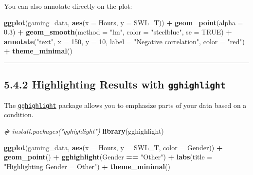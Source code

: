 \documentclass[
]{book}
\newenvironment{Shaded}{\begin{snugshade}}{\end{snugshade}}
\newcommand{\AttributeTok}[1]{\textcolor[rgb]{0.13,0.29,0.53}{#1}}
\newcommand{\CommentTok}[1]{\textcolor[rgb]{0.56,0.35,0.01}{\textit{#1}}}
\newcommand{\ConstantTok}[1]{\textcolor[rgb]{0.56,0.35,0.01}{#1}}
\newcommand{\DecValTok}[1]{\textcolor[rgb]{0.00,0.00,0.81}{#1}}
\newcommand{\FloatTok}[1]{\textcolor[rgb]{0.00,0.00,0.81}{#1}}
\newcommand{\FunctionTok}[1]{\textcolor[rgb]{0.13,0.29,0.53}{\textbf{#1}}}
\newcommand{\NormalTok}[1]{#1}
\newcommand{\SpecialCharTok}[1]{\textcolor[rgb]{0.81,0.36,0.00}{\textbf{#1}}}
\newcommand{\StringTok}[1]{\textcolor[rgb]{0.31,0.60,0.02}{#1}}
\begin{document}
You can also annotate directly on the plot:

\begin{Shaded}
\begin{Highlighting}[]
\FunctionTok{ggplot}\NormalTok{(gaming\_data, }\FunctionTok{aes}\NormalTok{(}\AttributeTok{x =}\NormalTok{ Hours, }\AttributeTok{y =}\NormalTok{ SWL\_T)) }\SpecialCharTok{+}
  \FunctionTok{geom\_point}\NormalTok{(}\AttributeTok{alpha =} \FloatTok{0.3}\NormalTok{) }\SpecialCharTok{+}
  \FunctionTok{geom\_smooth}\NormalTok{(}\AttributeTok{method =} \StringTok{"lm"}\NormalTok{, }\AttributeTok{color =} \StringTok{"steelblue"}\NormalTok{, }\AttributeTok{se =} \ConstantTok{TRUE}\NormalTok{) }\SpecialCharTok{+}
  \FunctionTok{annotate}\NormalTok{(}\StringTok{"text"}\NormalTok{, }\AttributeTok{x =} \DecValTok{150}\NormalTok{, }\AttributeTok{y =} \DecValTok{10}\NormalTok{, }\AttributeTok{label =} \StringTok{"Negative correlation"}\NormalTok{, }\AttributeTok{color =} \StringTok{"red"}\NormalTok{) }\SpecialCharTok{+}
  \FunctionTok{theme\_minimal}\NormalTok{()}
\end{Highlighting}
\end{Shaded}

\begin{center}\rule{0.5\linewidth}{0.5pt}\end{center}

\subsection{\texorpdfstring{5.4.2 Highlighting Results with \texttt{gghighlight}}{5.4.2 Highlighting Results with gghighlight}}\label{highlighting-results-with-gghighlight}

The \href{https://github.com/yutannihilation/gghighlight}{\texttt{gghighlight}} package allows you to emphasize parts of your data based on a condition.

\begin{Shaded}
\begin{Highlighting}[]
\CommentTok{\# install.packages("gghighlight")}
\FunctionTok{library}\NormalTok{(gghighlight)}

\FunctionTok{ggplot}\NormalTok{(gaming\_data, }\FunctionTok{aes}\NormalTok{(}\AttributeTok{x =}\NormalTok{ Hours, }\AttributeTok{y =}\NormalTok{ SWL\_T, }\AttributeTok{color =}\NormalTok{ Gender)) }\SpecialCharTok{+}
  \FunctionTok{geom\_point}\NormalTok{() }\SpecialCharTok{+}
  \FunctionTok{gghighlight}\NormalTok{(Gender }\SpecialCharTok{==} \StringTok{"Other"}\NormalTok{) }\SpecialCharTok{+}
  \FunctionTok{labs}\NormalTok{(}\AttributeTok{title =} \StringTok{"Highlighting Gender = \textquotesingle{}Other\textquotesingle{}"}\NormalTok{) }\SpecialCharTok{+}
  \FunctionTok{theme\_minimal}\NormalTok{()}
\end{Highlighting}
\end{Shaded}
\end{document}
